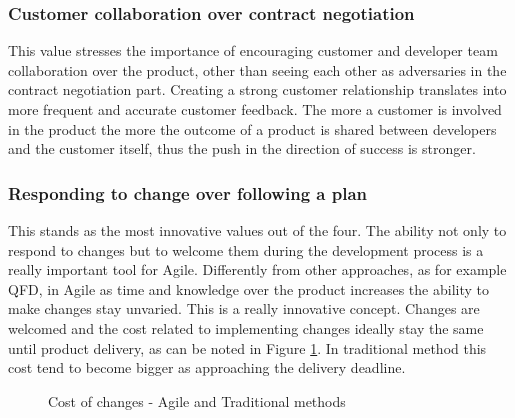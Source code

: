\documentclass[../main.tex]{subfiles}
\begin{document}
\subsubsection{Customer collaboration over contract negotiation}
This value stresses the importance of encouraging customer and developer team collaboration over the product, other than seeing each other as adversaries in the contract negotiation part.
Creating a strong customer relationship translates into more frequent and accurate customer feedback. The more a customer is involved in the product the more the outcome of a product is shared between developers and the customer itself, thus the push in the direction of success is stronger.  
\subsubsection{Responding to change over following a plan}
This stands as the most innovative values out of the four. The ability not only to respond to changes but to welcome them during the development process is a really important tool for Agile. Differently from other approaches, as for example QFD, in Agile as time and knowledge over the product increases the ability to make changes stay unvaried. This is a really innovative concept. Changes are welcomed and the cost related to implementing changes ideally stay the same until product delivery, as can be noted in Figure \ref{fig:agilevswaterfall}. In traditional method this cost tend to become bigger as approaching the delivery deadline.
\begin{figure}[H]
\centering
{}
\caption{Cost of changes - Agile and Traditional methods}
    \label{fig:agilevswaterfall}
\end{figure}
\end{document}
